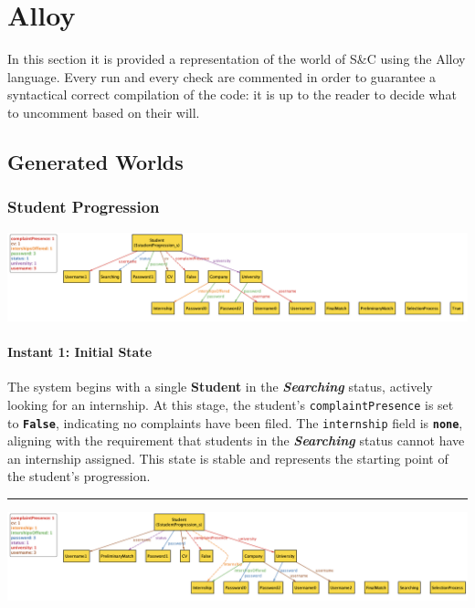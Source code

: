 \chapter{Alloy}

In this section it is provided a representation of the world of S\&C using the Alloy language. Every
run and every check are commented in order to guarantee a syntactical correct compilation of the
code: it is up to the reader to decide what to uncomment based on their will.



\newpage
\section{Generated Worlds}

\graphicspath{ {./images/alloy/} }

\subsection{Student Progression}

\vspace{5mm}
\includegraphics[width=\textwidth]{a1.png}

\subsubsection*{Instant 1: Initial State}
The system begins with a single \textbf{Student} in the \textbf{\textit{Searching}} status, actively looking for an internship. At this stage, the student's \texttt{complaintPresence} is set to \textbf{\texttt{False}}, indicating no complaints have been filed. The \texttt{internship} field is \textbf{\texttt{none}}, aligning with the requirement that students in the \textbf{\textit{Searching}} status cannot have an internship assigned. This state is stable and represents the starting point of the student's progression.
\\
\hrule
\vspace{5mm}
\includegraphics[width=\textwidth]{a2.png}


